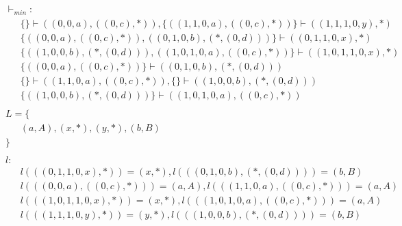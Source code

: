 \begin{align*}
	 & \ \  & \\ 
	 & \ \ \vdash_{{min}}: & \\ 
	 & \qquad \{  \} \vdash ((0, 0, a), ((0, c), *)), \{ ((1, 1, 0, a), ((0, c), *)) \} \vdash ((1, 1, 1, 0, y), *) \\ 
	 & \qquad \{ ((0, 0, a), ((0, c), *)), ((0, 1, 0, b), (*, (0, d))) \} \vdash ((0, 1, 1, 0, x), *) \\ 
	 & \qquad \{ ((1, 0, 0, b), (*, (0, d))), ((1, 0, 1, 0, a), ((0, c), *)) \} \vdash ((1, 0, 1, 1, 0, x), *) \\ 
	 & \qquad \{ ((0, 0, a), ((0, c), *)) \} \vdash ((0, 1, 0, b), (*, (0, d))) \\ 
	 & \qquad \{  \} \vdash ((1, 1, 0, a), ((0, c), *)), \{  \} \vdash ((1, 0, 0, b), (*, (0, d))) \\ 
	 & \qquad \{ ((1, 0, 0, b), (*, (0, d))) \} \vdash ((1, 0, 1, 0, a), ((0, c), *)) \\ 
	 & \ \  & \\ 
	 & \ \ L=\{ & \\ 
	 & \qquad (a, A), (x, *), (y, *), (b, B) \\ 
	 & \ \ \} & \\ 
	 & \ \  & \\ 
	 & \ \ l: & \\ 
	 & \qquad l(((0, 1, 1, 0, x), *)) = (x, *), l(((0, 1, 0, b), (*, (0, d)))) = (b, B) \\ 
	 & \qquad l(((0, 0, a), ((0, c), *))) = (a, A), l(((1, 1, 0, a), ((0, c), *))) = (a, A) \\ 
	 & \qquad l(((1, 0, 1, 1, 0, x), *)) = (x, *), l(((1, 0, 1, 0, a), ((0, c), *))) = (a, A) \\ 
	 & \qquad l(((1, 1, 1, 0, y), *)) = (y, *), l(((1, 0, 0, b), (*, (0, d)))) = (b, B) \\ 
	 & \ \  & \\ 
\end{align*} 
